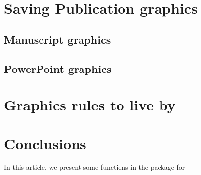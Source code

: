 \documentclass[nojss]{jss}\usepackage[]{graphicx}\usepackage[]{color}
\begin{document}
\section{Saving Publication graphics}\label{S:saving}

\subsection{Manuscript graphics}

\subsection{PowerPoint graphics}

\section{Graphics rules to live by}\label{S:rules}

\section{Conclusions} \label{S:concl}
In this article, we present some functions in the  package for  



\end{document}
